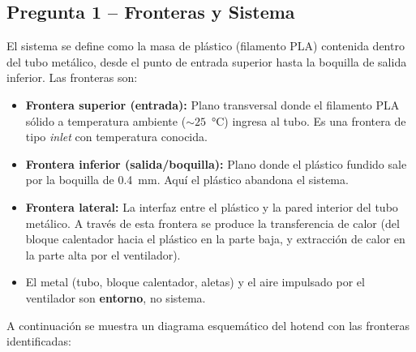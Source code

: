 \documentclass[12pt,a4paper]{article}
\begin{document}
\subsection*{Pregunta 1 -- Fronteras y Sistema}

\noindent El sistema se define como la masa de plástico (filamento PLA) contenida dentro del tubo
metálico, desde el punto de entrada superior hasta la boquilla de salida inferior.
Las fronteras son:

\begin{itemize}
    \item \textbf{Frontera superior (entrada):} Plano transversal donde el filamento PLA sólido a
          temperatura ambiente (${\sim}25$~°C) ingresa al tubo. Es una frontera de tipo
          \textit{inlet} con temperatura conocida.

    \item \textbf{Frontera inferior (salida/boquilla):} Plano donde el plástico fundido sale por la
          boquilla de 0.4~mm. Aquí el plástico abandona el sistema.

    \item \textbf{Frontera lateral:} La interfaz entre el plástico y la pared interior del tubo
          metálico. A través de esta frontera se produce la transferencia de calor (del bloque
          calentador hacia el plástico en la parte baja, y extracción de calor en la parte alta por
          el ventilador).

    \item El metal (tubo, bloque calentador, aletas) y el aire impulsado por el ventilador son
          \textbf{entorno}, no sistema.
\end{itemize}

\noindent A continuación se muestra un diagrama esquemático del hotend con las fronteras
identificadas:
\end{document}
